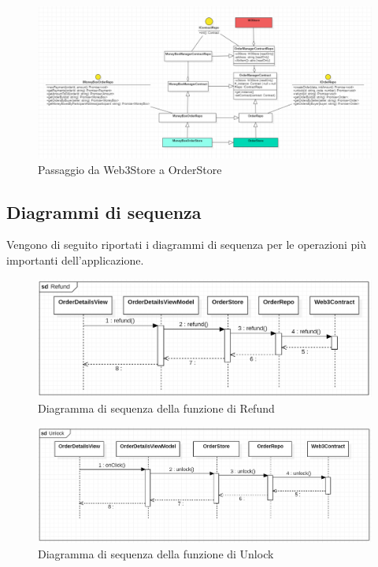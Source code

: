 \begin{landscape}
    \begin{figure}[H]
        \begin{center}
        \includegraphics[scale=0.7]{immagini/contractrepo.png}
        \caption{Passaggio da Web3Store a OrderStore}
        \end{center}
    \end{figure}
\end{landscape}
    
\subsection{Diagrammi di sequenza}

Vengono di seguito riportati i diagrammi di sequenza per le operazioni più importanti dell'applicazione.

\begin{figure}[H]
    \begin{center}
    \includegraphics[width=\textwidth]{immagini/refund.png}
    \caption{Diagramma di sequenza della funzione di Refund}
    \end{center}
\end{figure}

\begin{figure}[H]
    \begin{center}
    \includegraphics[width=\textwidth]{immagini/unlock.png}
    \caption{Diagramma di sequenza della funzione di Unlock}
    \end{center}
\end{figure}


